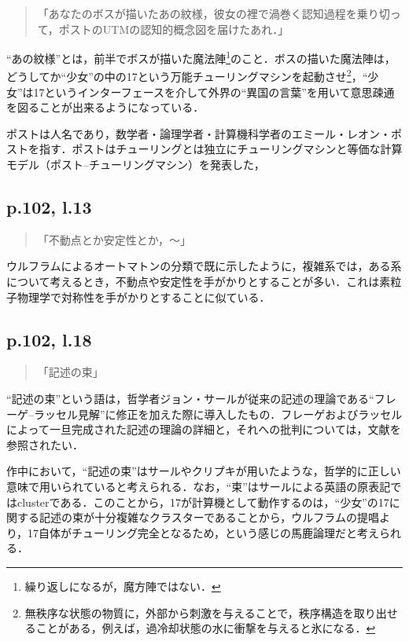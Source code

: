 \documentclass[10pt, a5paper, twoside]{jsarticle}
\theoremstyle{definition}
\begin{document}
			\begin{quote}

				「あなたのボスが描いたあの紋様，彼女の裡で渦巻く認知過程を乗り切って，ポストのUTMの認知的概念図を届けたあれ．」
				
			\end{quote}

			“あの紋様”とは，前半でボスが描いた魔法陣\footnote{繰り返しになるが，魔方陣ではない．}のこと．ボスの描いた魔法陣は，どうしてか“少女”の中の17という万能チューリングマシンを起動させ\footnote{無秩序な状態の物質に，外部から刺激を与えることで，秩序構造を取り出せることがある，例えば，過冷却状態の水に衝撃を与えると氷になる．}，“少女”は17というインターフェースを介して外界の“異国の言葉”を用いて意思疎通を図ることが出来るようになっている．

			ポストは人名であり，数学者・論理学者・計算機科学者のエミール・レオン・ポストを指す．ポストはチューリングとは独立にチューリングマシンと等価な計算モデル（ポスト--チューリングマシン）を発表した，

		\subsection{p.102, l.13}

			\begin{quote}

				「不動点とか安定性とか，〜」
				
			\end{quote}

			ウルフラムによるオートマトンの分類で既に示したように，複雑系では，ある系について考えるとき，不動点や安定性を手がかりとすることが多い．これは素粒子物理学で対称性を手がかりとすることに似ている．

		\subsection{p.102, l.18}

			\begin{quote}

				「記述の束」
				
			\end{quote}

			“記述の束”という語は，哲学者ジョン・サールが従来の記述の理論である“フレーゲ--ラッセル見解”に修正を加えた際に導入したもの．フレーゲおよびラッセルによって一旦完成された記述の理論の詳細と，それへの批判については，文献\cite{iid1,iid2,iid3}を参照されたい．

			作中において，“記述の束”はサールやクリプキが用いたような，哲学的に正しい意味で用いられていると考えられる．なお，“束”はサールによる英語の原表記ではclusterである．このことから，17が計算機として動作するのは，“少女”の17に関する記述の束が十分複雑なクラスターであることから，ウルフラムの提唱より，17自体がチューリング完全となるため，という感じの馬鹿論理だと考えられる．
\end{document}
